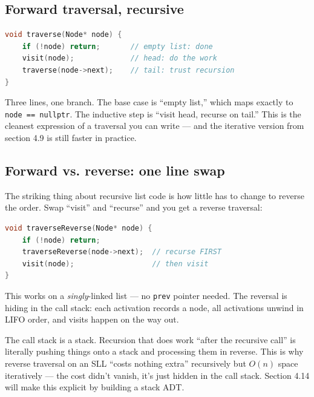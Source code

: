 \documentclass[11pt]{article}
\begin{document}
\subsection*{Forward traversal, recursive}

\begin{examplebox}
\begin{lstlisting}[language=C++,basicstyle=\ttfamily\small,frame=single]
void traverse(Node* node) {
    if (!node) return;       // empty list: done
    visit(node);             // head: do the work
    traverse(node->next);    // tail: trust recursion
}
\end{lstlisting}
\end{examplebox}

Three lines, one branch. The base case is ``empty list,'' which
maps exactly to \texttt{node == nullptr}. The inductive step is
``visit head, recurse on tail.'' This is the cleanest expression
of a traversal you can write --- and the iterative version from
section 4.9 is still faster in practice.

\subsection*{Forward vs. reverse: one line swap}

The striking thing about recursive list code is how little has to
change to reverse the order. Swap ``visit'' and ``recurse'' and
you get a reverse traversal:

\begin{examplebox}
\begin{lstlisting}[language=C++,basicstyle=\ttfamily\small,frame=single]
void traverseReverse(Node* node) {
    if (!node) return;
    traverseReverse(node->next);  // recurse FIRST
    visit(node);                  // then visit
}
\end{lstlisting}
\end{examplebox}

This works on a \emph{singly}-linked list --- no \texttt{prev}
pointer needed. The reversal is hiding in the call stack: each
activation records a node, all activations unwind in LIFO order,
and visits happen on the way out.

\begin{ideabox}
The call stack is a stack. Recursion that does work ``after the
recursive call'' is literally pushing things onto a stack and
processing them in reverse. This is why reverse traversal on an
SLL ``costs nothing extra'' recursively but $O(n)$ space
iteratively --- the cost didn't vanish, it's just hidden in the
call stack. Section 4.14 will make this explicit by building a
stack ADT.
\end{ideabox}
\end{document}
